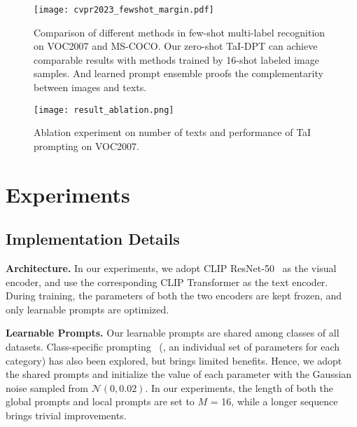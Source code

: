 \documentclass[10pt,twocolumn,letterpaper]{article}
\begin{document}
\begin{figure*}[h]
\begin{minipage}[t]{0.65\linewidth}
    \centering
    \texttt{[image: cvpr2023\_fewshot\_margin.pdf]}
\vspace{-8mm}
      \caption{Comparison of different methods in few-shot multi-label recognition on VOC2007 and MS-COCO. Our zero-shot TaI-DPT can achieve comparable results with methods trained by 16-shot labeled image samples. And learned prompt ensemble proofs the complementarity between images and texts.}
    \vspace{-6mm}
    \label{fig:fewshot}
\end{minipage}
\hfill
\begin{minipage}[t]{0.32\linewidth}
\centering
    \texttt{[image: result\_ablation.png]} \vspace{-6mm} \caption{Ablation experiment on number of texts and performance of TaI prompting on VOC2007.}
    \vspace{-6mm}
    \label{fig:ablation}
\end{minipage}

\end{figure*}



\section{Experiments}
\label{sec:experiments}

\subsection{Implementation Details}
\label{e:1}
\noindent \textbf{Architecture.} 
In our experiments, we adopt CLIP ResNet-50~\cite{clip} as the visual encoder, and use the corresponding CLIP Transformer as the text encoder.
During training, the parameters of both the two encoders are kept frozen, and only learnable prompts are optimized.

\noindent \textbf{Learnable Prompts.} 
Our learnable prompts are shared among classes of all datasets. 
Class-specific prompting~\cite{coop} (\ie, an individual set of parameters for each category) has also been explored, but brings limited benefits.
Hence, we adopt the shared prompts and initialize the value of each parameter with the Gaussian noise sampled from $\mathcal{N}(0, 0.02)$.
In our experiments, the length of both the global prompts and local prompts are set to $M$ = 16, while a longer sequence brings trivial improvements. 
\end{document}
